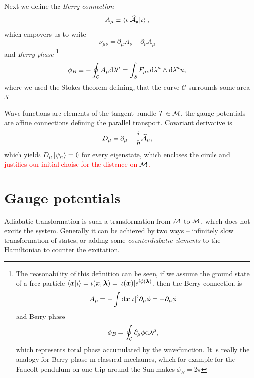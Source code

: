 Next we define the \emph{Berry connection}
\begin{equation}
    A_\mu\equiv \braket{\iota|\AA_\mu|\iota},
\end{equation}
which empovers us to write
\begin{equation}
    \nu_{\mu\nu} = \partial_\mu A_\nu-\partial_\nu A_\mu
\end{equation}
and \emph{Berry phase}
    \footnote{
        The reasonability of this definition can be seen, if we assume the ground state of a free particle
            $\braket{\bm{x}|\iota}=\iota(\bm{x},\llambda)= |\iota(\bm{x})|e^{i\phi(\llambda)}$,
        then the Berry connection is
        \begin{equation}
            A_\mu=-\int \d \bm{x}|\iota|^2\partial_\mu \phi = -\partial_\mu \phi
        \end{equation} 
        and Berry phase
        \begin{equation}
            \phi_B=\oint_\mathcal{C} \partial_\mu \phi \d \lambda^\mu,
        \end{equation}
        which represents total phase accumulated by the wavefunction. It is really the analogy for Berry phase in classical mechanics, which for example for the Faucolt pendulum on one trip around the Sun makes $\phi_B=2\pi$
    }
\begin{equation}
    \phi_B\equiv-\oint_\mathcal{C} A_\mu \d \lambda^\mu=\int_\mathcal{S} F_{\mu\nu}\d \lambda^\mu \wedge \d\lambda^nu,
\end{equation}
where we used the Stokes theorem defining, that the curve $\mathcal{C}$ surrounds some area $\mathcal{S}$.

Wave-functions are elements of the tangent bundle $\TT\in \M$, the gauge potentials are affine connections defining the parallel transport. Covariant derivative is
\begin{equation}
    D_\mu=\partial_\mu+\frac{i}{\hbar}\AA_\mu,
\end{equation}
which yields $D_\mu\ket{\psi_n}=0$ for every eigenstate, which encloses the circle and \textcolor{red}{justifies our initial choise for the distance on $\M$.}








\section{Gauge potentials}
Adiabatic transformation is such a transformation from $\M$ to $\M$, which does not excite the system. Generally it can be achieved by two ways -- infinitely slow transformation of states, or adding some \emph{counterdiabatic elements} to the Hamiltonian to counter the excitation.


